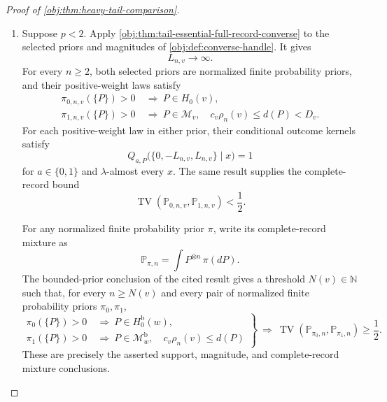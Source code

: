 \documentclass[11pt]{article}
\begin{document}
\begin{proof}[Proof of \cref{obj:thm:heavy-tail-comparison}]
\begin{enumerate}
If \(p<2\), the two channel differences displayed above are strictly positive. Therefore
\[
E(p)\le E_0(p)<E_0(2),
\qquad
E(p)\le E_4(p)<E_4(2),
\]
and hence
\[
E(p)<\min\{E_0(2),E_4(2)\}=E(2).
\]
Using the scale definitions in \cref{obj:def:sharp-frontier-scales}, we obtain
\[
\frac{\rho_n(v)}{\rho_n^{\mathrm b}(w)}
=n^{E(2)-E(p)}
\longrightarrow\infty.
\]

\item Suppose \(p<2\). Apply \cref{obj:thm:tail-essential-full-record-converse} to the selected priors and magnitudes of \cref{obj:def:converse-handle}. It gives
\[
L_{n,v}\longrightarrow\infty.
\]
For every \(n\ge2\), both selected priors are normalized finite probability priors, and their positive-weight laws satisfy
\[
\begin{aligned}
\pi_{0,n,v}(\{P\})>0
&\ \Longrightarrow\ P\in H_0(v),\\
\pi_{1,n,v}(\{P\})>0
&\ \Longrightarrow\
P\in\mathcal M_v,\quad
c_v\rho_n(v)\le d(P)<D_v.
\end{aligned}
\]
For each positive-weight law in either prior, their conditional outcome kernels satisfy
\[
Q_{a,P}\bigl(\{0,-L_{n,v},L_{n,v}\}\mid x\bigr)=1
\]
for \(a\in\{0,1\}\) and \(\lambda\)-almost every \(x\). The same result supplies the complete-record bound
\[
\operatorname{TV}(\mathbb P_{0,n,v},\mathbb P_{1,n,v})
<\frac12.
\]

For any normalized finite probability prior \(\pi\), write its complete-record mixture as
\[
\mathbb P_{\pi,n}=\int P^{\otimes n}\,\pi(dP).
\]
The bounded-prior conclusion of the cited result gives a threshold \(N(v)\in\mathbb N\) such that, for every \(n\ge N(v)\) and every pair of normalized finite probability priors \(\pi_0,\pi_1\),
\[
\left.
\begin{aligned}
\pi_0(\{P\})>0&\ \Longrightarrow\ P\in H_0^{\mathrm b}(w),\\
\pi_1(\{P\})>0&\ \Longrightarrow\
P\in\mathcal M_w^{\mathrm b},\quad c_v\rho_n(v)\le d(P)
\end{aligned}
\right\}
\ \Longrightarrow\
\operatorname{TV}(\mathbb P_{\pi_0,n},\mathbb P_{\pi_1,n})
\ge\frac12.
\]
These are precisely the asserted support, magnitude, and complete-record mixture conclusions.


\end{enumerate}
\end{proof}
\end{document}
